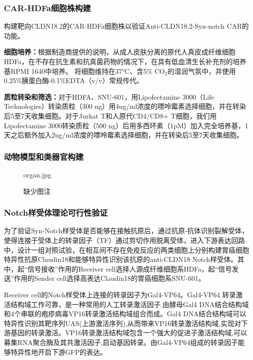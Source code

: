 \documentclass[12pt]{article}
\begin{document}
\subsubsection{CAR-HDFa细胞株构建}

构建靶向CLDN18.2的CAR-HDFa细胞株以验证Anti-CLDN18.2-Syn-notch CAR的功能。

\textbf{细胞培养：}根据制造商提供的说明，从成人皮肤分离的原代人真皮成纤维细胞HDFa，在不存在抗生素和抗真菌药物的情况下，在具有低血清生长补充剂的培养基RPMI 1640中培养。
将细胞维持在37°C、含5\% $\mathrm{CO}_2$的湿润气氛中，并使用0.25\%胰蛋白酶-0.1\%EDTA（v/v）常规传代。

\textbf{质粒转染和筛选：}对于HDFA、SNU-601，用Lipofectamine 3000（Life Technologies）转染质粒（300 ng）用4ug/ml浓度的嘌呤霉素选择细胞，并在转染后5至7天收集细胞。对于Jurkat T和人原代CD4/CD8+ T细胞，我们用Lipofectamine 3000转染质粒（500 ng）后用多西环素（1pM）加入完全培养基，1天之后额外加入2ug/ml浓度的嘌呤霉素选择细胞，并在转染后5至7天收集细胞。

\subsubsection{动物模型和类器官构建}

\begin{figure}[h]
	\centering
	\begin{overpic}[width=0.6\columnwidth]{organ.jpg}
	\end{overpic}
	\caption{缺少图注}
	\label{organ}
\end{figure}

\subsubsection{Notch样受体理论可行性验证}

为了验证Syn-Notch样受体是否能够在接触抗原后，通过抗原-抗体识别裂解受体，使得连接于受体上的转录因子（TF）通过剪切作用脱离受体，进入下游表达回路中，设计一组对照试验，在相互间不存在免疫反应的两类细胞上分别构建胃癌细胞特异性抗原Claudin18和能够特异性识别该抗原的anti-CLDN18 Notch样受体。其中，起“信号接收”作用的Receiver cell选择人源成纤维细胞系HDFa，起“信号发送”作用的Sender cell选择高表达Claudin18的胃癌细胞系SNU-601。

Receiver cell的Notch样受体上连接的转录因子为Gal4-VP64。Gal4-VP64 转录激活结构域工作可靠，是一种常用的人工转录激活因子,由酵母Gal4 DNA结合结构域和4个串联的疱疹病毒VP16转录激活结构域组合而成。Gal4 DNA结合结构域可以特异性识别其靶序列UAS(上游激活序列),从而带来VP16转录激活结构域,实现对下游基因的转录激活。VP16转录激活结构域包含一个强大的促进子激活结构域,可以募集RNA聚合酶及其共激活因子,启动基因转录。由Gal4-VP64组成的转录因子能够特异性地开启下游GFP的表达。
\end{document}
